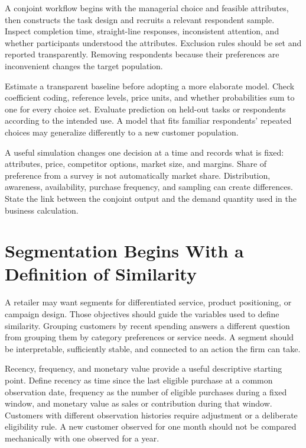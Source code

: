 \noindent A conjoint workflow begins with the managerial choice and feasible
attributes, then constructs the task design and recruits a relevant
respondent sample. Inspect completion time, straight-line responses,
inconsistent attention, and whether participants understood the
attributes. Exclusion rules should be set and reported transparently.
Removing respondents because their preferences are inconvenient changes
the target population.

Estimate a transparent baseline before adopting a more elaborate model.
Check coefficient coding, reference levels, price units, and whether
probabilities sum to one for every choice set. Evaluate prediction on
held-out tasks or respondents according to the intended use. A model
that fits familiar respondents' repeated choices may generalize
differently to a new customer population.

A useful simulation changes one decision at a time and records what is
fixed: attributes, price, competitor options, market size, and margins.
Share of preference from a survey is not automatically market share.
Distribution, awareness, availability, purchase frequency, and sampling
can create differences. State the link between the conjoint output and
the demand quantity used in the business calculation.

\hypertarget{M04-segmentation-begins-with-a-definition-of-similarity}{%
\section{Segmentation Begins With a Definition of
Similarity}\label{M04-segmentation-begins-with-a-definition-of-similarity}}

\noindent A retailer may want segments for differentiated service, product
positioning, or campaign design. Those objectives should guide the
variables used to define similarity. Grouping customers by recent
spending answers a different question from grouping them by category
preferences or service needs. A segment should be interpretable,
sufficiently stable, and connected to an action the firm can take.

Recency, frequency, and monetary value provide a useful descriptive
starting point. Define recency as time since the last eligible purchase
at a common observation date, frequency as the number of eligible
purchases during a fixed window, and monetary value as sales or
contribution during that window. Customers with different observation
histories require adjustment or a deliberate eligibility rule. A new
customer observed for one month should not be compared mechanically with
one observed for a year.

